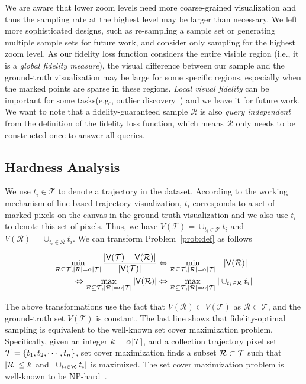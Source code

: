 We are aware that lower zoom levels need more coarse-grained visualization and thus the sampling rate at the highest level may be larger than necessary. We left more sophisticated designs, such as re-sampling a sample set or generating multiple sample sets for future work, and consider only sampling for the highest zoom level. As our fidelity loss function considers the entire visible region (i.e., it is a \textit{global fidelity measure}), the visual difference between our sample and the ground-truth visualization may be large for some specific regions, especially when the marked points are sparse in these regions. \textit{Local visual fidelity} can be important for some tasks(e.g., outlier discovery~\cite{feng2010matching,mayorga2013splatterplots}) and we leave it for future work. We want to note that a fidelity-guaranteed sample $\mathcal{R}$ is also \textit{query independent} from the definition of the fidelity loss function, which means $\mathcal{R}$ only needs to be constructed once to answer all queries.






\subsection{Hardness Analysis}\label{sec:hard}
We use $t_i \in \mathcal{T}$ to denote a trajectory in the dataset. According to the working mechanism of line-based trajectory visualization, $t_i$ corresponds to a set of marked pixels on the canvas in the ground-truth visualization and we also use $t_i$ to denote this set of pixels. Thus, we have $V(\mathcal{T}) = \cup_{t_i \in \mathcal{T}} t_i$ and $V(\mathcal{R}) = \cup_{t_i \in \mathcal{R}} t_i$. We can transform Problem~\ref{prob:def} as follows

\begin{align}\label{eqn:obj2} \nonumber
\min_{\mathcal{R} \subseteq \mathcal{T}, |\mathcal{R}| = \alpha |\mathcal{T}|}  \frac{|\mathsf{V}(\mathcal{T}) - \mathsf{V}(\mathcal{R})|}{|\mathsf{V}(\mathcal{T})|}  & \Leftrightarrow \min_{\mathcal{R} \subseteq \mathcal{T}, |\mathcal{R}| = \alpha |\mathcal{T}|}   - |\mathsf{V}(\mathcal{R})| \\ \nonumber
 \Leftrightarrow \max_{\mathcal{R} \subseteq \mathcal{T}, |\mathcal{R}| = \alpha |\mathcal{T}|}  |\mathsf{V}(\mathcal{R})| &  \Leftrightarrow \max_{\mathcal{R} \subseteq \mathcal{T}, |\mathcal{R}| = \alpha |\mathcal{T}|} | \cup_{t_i \in \mathcal{R}} t_i |
\end{align}

The above transformations use the fact that $V(\mathcal{R}) \subset V(\mathcal{T})$ as $\mathcal{R} \subset \mathcal{T}$, and the ground-truth set $V(\mathcal{T})$ is constant. The last line shows that fidelity-optimal sampling is equivalent to the well-known set cover maximization problem.
Specifically, given an integer $k = \alpha |\mathcal{T}|$, and a collection trajectory pixel set $\mathcal{T} = \{t_1, t_2, \cdots, t_n \}$, set cover maximization finds a subset $\mathcal{R} \subset \mathcal{T}$ such that $|\mathcal{R}| \leq k$ and $|\cup_{t_i \in \mathcal{R}} t_i|$ is maximized. The set cover maximization problem is well-known to be NP-hard~\cite{setcover}.


